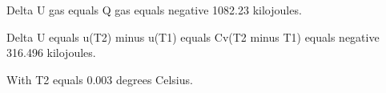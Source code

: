 Delta U gas equals Q gas equals negative 1082.23 kilojoules.

Delta U equals u(T2) minus u(T1) equals Cv(T2 minus T1) equals negative 316.496 kilojoules.

With T2 equals 0.003 degrees Celsius.